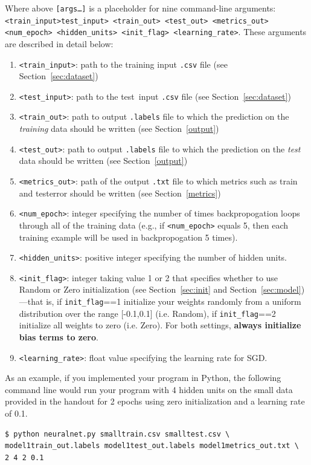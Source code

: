 \documentclass[11pt]{article}
\numberwithin{equation}{section} %
\numberwithin{figure}{section} %
\numberwithin{table}{section} %
\newcommand{\ntset}{test}
\begin{document}
Where above \texttt{[args\dots]} is a placeholder for nine command-line arguments: \texttt{<train\_input>}\newline \texttt{\ntset\_input> <train\_out> <\ntset\_out> <metrics\_out> <num\_epoch> \newline <hidden\_units>  <init\_flag> <learning\_rate>}. These arguments are described in detail below:
\begin{enumerate}
    \item \texttt{<train\_input>}: path to the training input \texttt{.csv} file (see Section~\ref{sec:dataset})
    \item \texttt{<\ntset\_input>}: path to the \ntset \ input \texttt{.csv} file (see Section~\ref{sec:dataset})
    \item \texttt{<train\_out>}: path to output \texttt{.labels} file to which the prediction on the \emph{training} data should be written (see Section~\ref{output})
    \item \texttt{<\ntset\_out>}: path to output \texttt{.labels} file to which the prediction on the \emph{\ntset} data should be written (see Section~\ref{output})
    \item \texttt{<metrics\_out>}: path of the output \texttt{.txt} file to which metrics such as train and \ntset\thinspace error should be written (see Section~\ref{metrics})
    \item \texttt{<num\_epoch>}: integer specifying the number of times backpropogation loops through all of the training data (e.g., if \texttt{<num\_epoch>} equals 5, then each training example will be used in backpropogation 5 times).
    \item \texttt{<hidden\_units>}: positive integer specifying the number of hidden units. 
    \item \texttt{<init\_flag>}: integer taking value 1 or 2 that specifies whether to use {\sc Random} or {\sc Zero} initialization (see Section~\ref{sec:init} and Section~\ref{sec:model})---that is, if \lstinline{init_flag}==1 initialize your weights randomly from a uniform distribution over the range [-0.1,0.1] (i.e. {\sc Random}), if \lstinline{init_flag}==2 initialize all weights to zero (i.e. {\sc Zero}). For both settings, {\bf always initialize bias terms to zero}.
    \item \texttt{<learning\_rate>}: float value specifying the learning rate for SGD.
    
\end{enumerate}

As an example, if you implemented your program in Python, the following command line would run your program with 4 hidden units on the small data provided in the handout for 2 epochs using zero initialization and a learning rate of 0.1.
\\
\begin{lstlisting}[language=Shell]
$ python neuralnet.py smalltrain.csv smalltest.csv \ 
model1train_out.labels model1test_out.labels model1metrics_out.txt \ 
2 4 2 0.1
\end{lstlisting}
\end{document}
